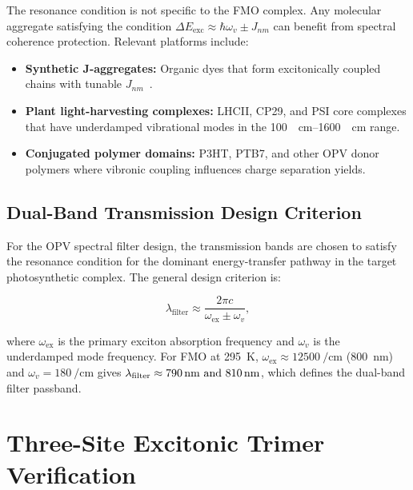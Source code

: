 \documentclass[11pt,a4paper]{article}
\begin{document}
The resonance condition is not specific to the FMO complex.
Any molecular aggregate satisfying the condition $\Delta E_{\mathrm{exc}} \approx \hbar\omega_v \pm J_{nm}$ can benefit from spectral coherence protection.
Relevant platforms include:

\begin{itemize}
\item \textbf{Synthetic J-aggregates:} Organic dyes that form excitonically coupled chains with tunable $J_{nm}$~\cite{Jang2008}.
\item \textbf{Plant light-harvesting complexes:} LHCII, CP29, and PSI core complexes that have underdamped vibrational modes in the \SIrange{100}{1600}{\per\cm} range.
\item \textbf{Conjugated polymer domains:} P3HT, PTB7, and other OPV donor polymers where vibronic coupling influences charge separation yields.
\end{itemize}

\subsection{Dual-Band Transmission Design Criterion}

For the OPV spectral filter design, the transmission bands are chosen to satisfy the resonance condition for the dominant energy-transfer pathway in the target photosynthetic complex.
The general design criterion is:

\begin{equation}
\lambda_{\mathrm{filter}} \approx \frac{2\pi c}{\omega_{\mathrm{ex}} \pm \omega_v},
\label{eq:SI_filter_design}
\end{equation}

where $\omega_{\mathrm{ex}}$ is the primary exciton absorption frequency and $\omega_v$ is the underdamped mode frequency.
For FMO at \SI{295}{\kelvin}, $\omega_{\mathrm{ex}} \approx \SI{12500}{\per\cm}$ (\SI{800}{\nm}) and $\omega_v = \SI{180}{\per\cm}$ gives $\lambda_{\mathrm{filter}} \approx \qtylist{790;810}{\nm}$, which defines the dual-band filter passband.


\section{Three-Site Excitonic Trimer Verification}
\label{SI-sec:3site}
\end{document}

